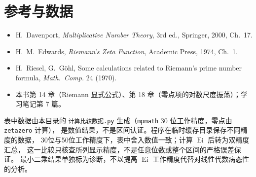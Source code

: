 \documentclass[11pt]{article}
\newcommand{\Ei}{\operatorname{Ei}}
\begin{document}
\section*{参考与数据}
\begin{itemize}
 \item H.\ Davenport, \emph{Multiplicative Number Theory}, 3rd ed., Springer, 2000, Ch.~17.
 \item H.\ M.\ Edwards, \emph{Riemann's Zeta Function}, Academic Press, 1974, Ch.~1.
 \item H.\ Riesel, G.\ Göhl, Some calculations related to Riemann's prime number formula, \emph{Math.\ Comp.} 24 (1970).
 \item 本书第 14 章（Riemann 显式公式）、第 18 章（零点项的对数尺度振荡）；学习笔记第 7 篇。
\end{itemize}
表中数据由本目录的 \texttt{计算比较数据.py} 生成（\texttt{mpmath} 30 位工作精度，零点由 \texttt{zetazero} 计算），
是数值结果，不是区间认证。程序在临时缓存目录保存不同精度的数据，
30位与50位工作精度下，表中舍入数值一致；计算 $\Ei$ 后转为双精度汇总，
这一比较只核查所列显示精度，不是任意位数或整个区间的严格误差保证。
最小二乘结果单独标为诊断，不以提高 $\Ei$ 工作精度代替对线性代数病态性的分析。
\end{document}
